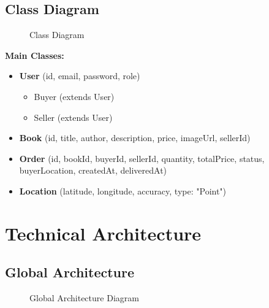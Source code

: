 \documentclass[12pt,a4paper]{article}
\begin{document}
\subsection{Class Diagram}

\begin{figure}[h]
    \centering
    \caption{Class Diagram}
\end{figure}

\textbf{Main Classes:}
\begin{itemize}
    \item \textbf{User} (id, email, password, role)
    \begin{itemize}
        \item Buyer (extends User)
        \item Seller (extends User)
    \end{itemize}
    \item \textbf{Book} (id, title, author, description, price, imageUrl, sellerId)
    \item \textbf{Order} (id, bookId, buyerId, sellerId, quantity, totalPrice, status, buyerLocation, createdAt, deliveredAt)
    \item \textbf{Location} (latitude, longitude, accuracy, type: "Point")
\end{itemize}

\newpage

\section{Technical Architecture}

\subsection{Global Architecture}

\begin{figure}[h]
    \centering
    \caption{Global Architecture Diagram}
\end{figure}
\end{document}
